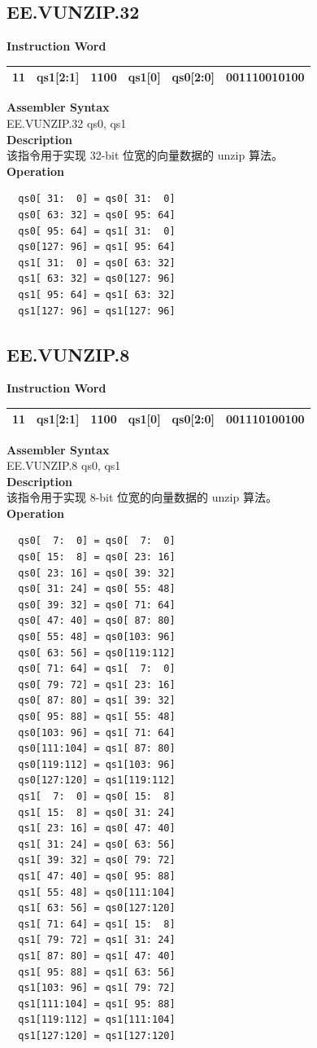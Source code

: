 \clearpage
\subsection{EE.VUNZIP.32}\label{instruction:EEVUNZIP32}
\setlength\tabcolsep{6pt}
\textbf{Instruction Word} \\
\begin{tabular}{|c|c|c|c|c|c|}
	\hline
	11 & qs1[2:1] & 1100 & qs1[0] & qs0[2:0] & 001110010100 \\
	\hline
\end{tabular}

\textbf{Assembler Syntax} \\
EE.VUNZIP.32 qs0, qs1 \\
\textbf{Description} \\
该指令用于实现 32-bit 位宽的向量数据的 unzip 算法。\\
\textbf{Operation}
\begin{lstlisting}
  qs0[ 31:  0] = qs0[ 31:  0]
  qs0[ 63: 32] = qs0[ 95: 64]
  qs0[ 95: 64] = qs1[ 31:  0]
  qs0[127: 96] = qs1[ 95: 64]
  qs1[ 31:  0] = qs0[ 63: 32]
  qs1[ 63: 32] = qs0[127: 96]
  qs1[ 95: 64] = qs1[ 63: 32]
  qs1[127: 96] = qs1[127: 96]
\end{lstlisting}

\clearpage
\subsection{EE.VUNZIP.8}\label{instruction:EEVUNZIP8}
\setlength\tabcolsep{6pt}
\textbf{Instruction Word} \\
\begin{tabular}{|c|c|c|c|c|c|}
	\hline
	11 & qs1[2:1] & 1100 & qs1[0] & qs0[2:0] & 001110100100 \\
	\hline
\end{tabular}

\textbf{Assembler Syntax} \\
EE.VUNZIP.8 qs0, qs1 \\
\textbf{Description} \\
该指令用于实现 8-bit 位宽的向量数据的 unzip 算法。\\
\textbf{Operation}
\begin{lstlisting}
  qs0[  7:  0] = qs0[  7:  0]
  qs0[ 15:  8] = qs0[ 23: 16]
  qs0[ 23: 16] = qs0[ 39: 32]
  qs0[ 31: 24] = qs0[ 55: 48]
  qs0[ 39: 32] = qs0[ 71: 64]
  qs0[ 47: 40] = qs0[ 87: 80]
  qs0[ 55: 48] = qs0[103: 96]
  qs0[ 63: 56] = qs0[119:112]
  qs0[ 71: 64] = qs1[  7:  0]
  qs0[ 79: 72] = qs1[ 23: 16]
  qs0[ 87: 80] = qs1[ 39: 32]
  qs0[ 95: 88] = qs1[ 55: 48]
  qs0[103: 96] = qs1[ 71: 64]
  qs0[111:104] = qs1[ 87: 80]
  qs0[119:112] = qs1[103: 96]
  qs0[127:120] = qs1[119:112]
  qs1[  7:  0] = qs0[ 15:  8]
  qs1[ 15:  8] = qs0[ 31: 24]
  qs1[ 23: 16] = qs0[ 47: 40]
  qs1[ 31: 24] = qs0[ 63: 56]
  qs1[ 39: 32] = qs0[ 79: 72]
  qs1[ 47: 40] = qs0[ 95: 88]
  qs1[ 55: 48] = qs0[111:104]
  qs1[ 63: 56] = qs0[127:120]
  qs1[ 71: 64] = qs1[ 15:  8]
  qs1[ 79: 72] = qs1[ 31: 24]
  qs1[ 87: 80] = qs1[ 47: 40]
  qs1[ 95: 88] = qs1[ 63: 56]
  qs1[103: 96] = qs1[ 79: 72]
  qs1[111:104] = qs1[ 95: 88]
  qs1[119:112] = qs1[111:104]
  qs1[127:120] = qs1[127:120]
\end{lstlisting}

